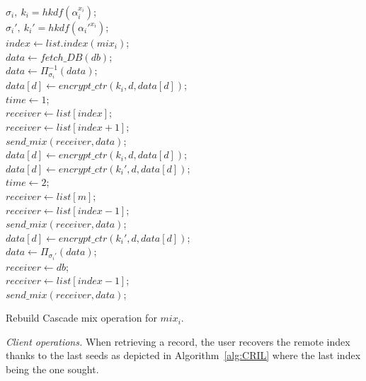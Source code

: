 \documentclass[USenglish,oneside,twocolumn]{article}
\begin{document}
\begin{algorithm}
\DontPrintSemicolon
{}
$\sigma_{i},\ k_{i}=hkdf(\alpha_{i}^{x_i})$;\\
$\sigma_{i}',\ k_{i}'=hkdf(\alpha_{i}'^{x_i})$;\\
$index \gets list.index(mix_i)$;\\
{
{
$data \gets fetch\_DB(db)$;\\
}
$data \gets \Pi_{\sigma_{i}}^{-1}(data)$;\\
{
	$data[d] \gets encrypt\_ctr(k_{i}, d, data[d])$;\\
}
$time \gets 1$;\\
$receiver \gets list[index]$;\\
{
$receiver \gets list[index+1]$;\\
}
$send\_mix(receiver, data)$;\\
}
{
{
	$data[d] \gets encrypt\_ctr(k_{i}, d, data[d])$;\\
    $data[d] \gets encrypt\_ctr(k_{i}', d, data[d])$;\\
}
$time \gets 2$;\\
$receiver \gets list[m]$;\\
{
$receiver \gets list[index-1]$;\\
}
$send\_mix(receiver, data)$;\\
}
\Else
{
{
$data[d] \gets encrypt\_ctr(k_{i}', d, data[d])$;\\
}
$data \gets \Pi_{\sigma_{i}'}(data)$;\\
$receiver \gets db$;\\
{
$receiver \gets list[index-1]$;\\
}
$send\_mix(receiver, data)$;\\
}
\caption{Rebuild Cascade mix operation for $mix_i$.}
\label{alg:RCmix}
\end{algorithm}

\noindent\textit{Client operations.} When retrieving a record, the user recovers the remote index thanks to the last seeds as depicted in Algorithm~\ref{alg:CRIL} where the last index being the one sought.\\
\end{document}
